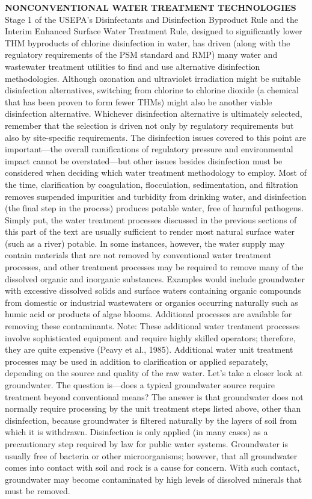 \documentclass{article}
\begin{document}
\textbf{NONCONVENTIONAL WATER TREATMENT TECHNOLOGIES}
Stage 1 of the USEPA’s Disinfectants and Disinfection Byproduct Rule and the Interim Enhanced Surface Water Treatment Rule, designed to significantly lower THM byproducts of chlorine disinfection in water, has driven (along with the regulatory requirements of the PSM standard and RMP) many water and wastewater treatment utilities to find and use alternative disinfection methodologies. Although ozonation and ultraviolet irradiation might be suitable disinfection alternatives, switching from chlorine to chlorine dioxide (a chemical that has been proven to form fewer THMs) might also be another viable disinfection alternative. Whichever disinfection alternative is ultimately selected, remember that the selection is driven not only by regulatory requirements but also by site-specific requirements.
The disinfection issues covered to this point are important—the overall ramifications of regulatory pressure and environmental impact cannot be overstated—but other issues besides disinfection must be considered when deciding which water treatment methodology to employ. Most of the time, clarification by coagulation, flocculation, sedimentation, and filtration removes suspended impurities and turbidity from drinking water, and disinfection (the final step in the process) produces potable water, free of harmful pathogens. Simply put, the water treatment processes discussed in the previous sections of this part of the text are usually sufficient to render most natural surface water (such as a river) potable. In some instances, however, the water supply may contain materials that are not removed by conventional water treatment processes, and other treatment processes may be required to remove many of the dissolved organic and inorganic substances. Examples would include groundwater with excessive dissolved solids and surface waters containing organic compounds from domestic or industrial wastewaters or organics occurring naturally such as humic acid or products of algae blooms. Additional processes are available for removing these contaminants.
Note: These additional water treatment processes involve sophisticated equipment and require highly skilled operators; therefore, they are quite expensive (Peavy et al., 1985).
Additional water unit treatment processes may be used in addition to clarification or applied separately, depending on the source and quality of the raw water. Let’s take a closer look at groundwater. The question is—does a typical groundwater source require treatment beyond conventional means? The answer is that groundwater does not normally require processing by the unit treatment steps listed above, other than disinfection, because groundwater is filtered naturally by the layers of soil from which it is withdrawn. Disinfection is only applied (in many cases) as a precautionary step required by law for public water systems. Groundwater is usually free
of bacteria or other microorganisms; however, that all groundwater comes into contact with soil and rock is a cause for concern. With such contact, groundwater may become contaminated by high levels of dissolved minerals that must be removed.
\end{document}
